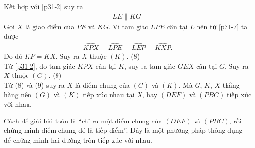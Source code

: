 \begin{bt}
{		Kết hợp với \eqref{p31-2} suy ra
		\begin{align}
		LE \parallel KG. \label{p31-7}
		\end{align}
		Gọi $X$ là giao điểm của $PE$ và $KG$. Vì tam giác $LPE$ cân tại $L$ nên từ \eqref{p31-7} ta được
		\begin{align*}
		\widehat{KPX}=\widehat{LPE}=\widehat{LEP}=\widehat{KXP}.
		\end{align*}
		Do đó $KP=KX$. Suy ra $X$ thuộc $(K)$. \hfill(8)\\
		Từ \eqref{p31-2}, do tam giác $KPX$ cân tại $K$, suy ra tam giác $GEX$ cân tại $G$. Suy ra $X$ thuộc $(G)$. \hfill(9)\\
		Từ (8) và (9) suy ra $X$ là điểm chung của $(G)$ và $(K)$. Mà $G$, $K$, $X$ thẳng hàng nên $(G)$ và $(K)$ tiếp xúc nhau tại $X$, hay $(DEF)$ và $(PBC)$ tiếp xúc với nhau.
		\begin{nx}
			Cách để giải bài toán là ``chỉ ra một điểm chung của $(DEF)$ và $(PBC)$, rồi chứng minh điểm chung đó là tiếp điểm''. Đây là một phương pháp thông dụng để chứng minh hai đường tròn tiếp xúc với nhau.
		\end{nx}
	}
\end{bt}

